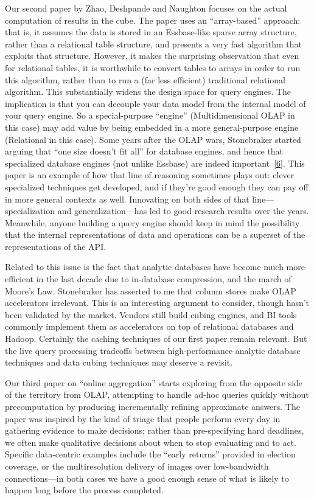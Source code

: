 \documentclass[b5paper,11pt,twoside,openright]{book}
\begin{document}
Our second paper by Zhao, Deshpande and Naughton focuses on the actual
computation of results in the cube. The paper uses an ``array-based''
approach: that is, it assumes the data is stored in an Essbase-like
sparse array structure, rather than a relational table structure, and
presents a very fast algorithm that exploits that structure. However, it
makes the surprising observation that even for relational tables, it is
worthwhile to convert tables to arrays in order to run this algorithm,
rather than to run a (far less efficient) traditional relational
algorithm. This substantially widens the design space for query engines.
The implication is that you can decouple your data model from the
internal model of your query engine. So a special-purpose ``engine''
(Multidimensional OLAP in this case) may add value by being embedded in
a more general-purpose engine (Relational in this case). Some years
after the OLAP wars, Stonebraker started arguing that ``one size doesn't
fit all'' for database engines, and hence that specialized database
engines (not unlike Essbase) are indeed
important~{{[}\protect\hyperlink{ref-onesize}{6}{]}}. This paper is an
example of how that line of reasoning sometimes plays out: clever
specialized techniques get developed, and if they're good enough they
can pay off in more general contexts as well. Innovating on both sides
of that line---specialization and generalization---has led to good
research results over the years. Meanwhile, anyone building a query
engine should keep in mind the possibility that the internal
representations of data and operations can be a superset of the
representations of the API.

Related to this issue is the fact that analytic databases have become
much more efficient in the last decade due to in-database compression,
and the march of Moore's Law. Stonebraker has asserted to me that column
stores make OLAP accelerators irrelevant. This is an interesting
argument to consider, though hasn't been validated by the market.
Vendors still build cubing engines, and BI tools commonly implement them
as accelerators on top of relational databases and Hadoop. Certainly the
caching techniques of our first paper remain relevant. But the live
query processing tradeoffs between high-performance analytic database
techniques and data cubing techniques may deserve a revisit.

Our third paper on ``online aggregation'' starts exploring from the
opposite side of the territory from OLAP, attempting to handle ad-hoc
queries quickly without precomputation by producing incrementally
refining approximate answers. The paper was inspired by the kind of
triage that people perform every day in gathering evidence to make
decisions; rather than pre-specifying hard deadlines, we often make
qualitative decisions about when to stop evaluating and to act. Specific
data-centric examples include the ``early returns'' provided in election
coverage, or the multiresolution delivery of images over low-bandwidth
connections---in both cases we have a good enough sense of what is
likely to happen long before the process completed.
\end{document}
